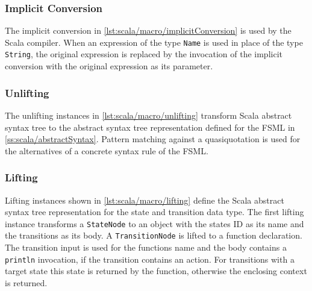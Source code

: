 \subsubsection{Implicit Conversion}

The implicit conversion in \autoref{lst:scala/macro/implicitConversion} is used by the Scala compiler.
When an expression of the type \lstinline{Name} is used in place of the type \lstinline{String}, the original expression is replaced by the invocation of the implicit conversion with the original expression as its parameter.




\subsubsection{Unlifting}
\label{scala:sss/macro/unlifting}

The unlifting instances in \autoref{lst:scala/macro/unlifting} transform Scala abstract syntax tree to the abstract syntax tree representation defined for the FSML in \autoref{ss:scala/abstractSyntax}.
Pattern matching against a quasiquotation is used for the alternatives of a concrete syntax rule of the FSML.



\subsubsection{Lifting}
\label{scala:sss/macro/lifting}

Lifting instances shown in \autoref{lst:scala/macro/lifting} define the Scala abstract syntax tree representation for the state and transition data type.
The first lifting instance transforms a \lstinline{StateNode} to an object with the states ID as its name and the transitions as its body.
A \lstinline{TransitionNode} is lifted to a function declaration.
The transition input is used for the functions name and the body contains a \lstinline{println} invocation, if the transition contains an action.
For transitions with a target state this state is returned by the function, otherwise the enclosing context is returned.

